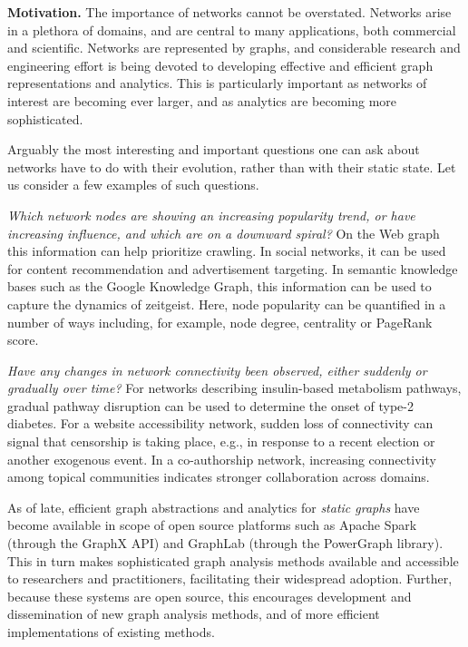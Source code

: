 \documentclass[11pt]{article}
\newcommand\eat[1]{}
\begin{document}
{\bf Motivation.}  The importance of networks cannot be
overstated. Networks arise in a plethora of domains, and are central
to many applications, both commercial and scientific.  Networks are
represented by graphs, and considerable research and engineering
effort is being devoted to developing effective and efficient graph
representations and analytics.  This is particularly important as
networks of interest are becoming ever larger, and as analytics are
becoming more sophisticated.

Arguably the most interesting and important questions one can ask
about networks have to do with their evolution, rather than with their
static state.  Let us consider a few examples of such questions.

{\em Which network nodes are showing an increasing popularity trend,
  or have increasing influence, and which are on a downward spiral?}
On the Web graph this information can help prioritize crawling.  In
social networks, it can be used for content recommendation and
advertisement targeting.  In semantic knowledge bases such as the
Google Knowledge Graph, this information can be used to capture the
dynamics of zeitgeist.  Here, node popularity can be quantified in a
number of ways including, for example, node degree, centrality or
PageRank score.

{\em Have any changes in network connectivity been observed, either
  suddenly or gradually over time?}  For networks describing
insulin-based metabolism pathways, gradual pathway disruption can be
used to determine the onset of type-2 diabetes.  For a website
accessibility network, sudden loss of connectivity can signal that
censorship is taking place, e.g., in response to a recent election or
another exogenous event.  In a co-authorship network, increasing
connectivity among topical communities indicates stronger
collaboration across domains.\eat{ Here, again, one may consider
  several ways of quantifying distance between nodes, including, e.g.,
  pair-wise distance, length of shortest path between communities, and
  graph density.}

As of late, efficient graph abstractions and analytics for {\em static
  graphs} have become available in scope of open source platforms such
as Apache Spark (through the GraphX API) and GraphLab (through the
PowerGraph library).  This in turn makes sophisticated graph analysis
methods available and accessible to researchers and practitioners,
facilitating their widespread adoption.  Further, because these
systems are open source, this encourages development and dissemination
of new graph analysis methods, and of more efficient implementations
of existing methods.
\end{document}
